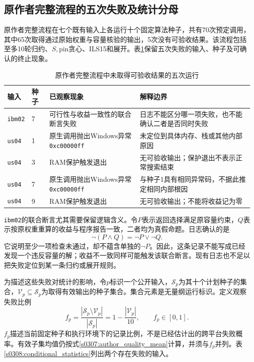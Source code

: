 \subsection{原作者完整流程的五次失败及统计分母}

原作者完整流程在七个既有输入上各运行十个固定算法种子，共有70次预定调用，其中65次取得通过原始权重与容量核验的输出，5次没有可验收结果。该流程包括至多10轮归约、$S,\mathrm{pin}$贪心、ILS15和展开\cite{GrossmannJRS2026}。表\ref{s0308:failure_details}保留五次失败的输入、种子及可确认的终止现象。

\begin{table}[tbp]
 \centering
 \small
 \caption{原作者完整流程中未取得可验收结果的五次运行}
 \label{s0308:failure_details}
 \begin{tabularx}{\linewidth}{@{}llXX@{}}
  \toprule
  输入 & 种子 & 已观察现象 & 解释边界\\
  \midrule
  \texttt{ibm02} & 7 & 可行性与收益一致性的联合断言失败 & 日志不能区分哪一项失败，也不能确认二者是否同时失败\\
  \texttt{us04} & 1 & 原生调用抛出Windows异常\texttt{0xc00000ff} & 未定位到具体内存、栈或其他内部原因\\
  \texttt{us04} & 3 & RAM保护触发退出 & 无可验收输出；保护退出不表示正常搜索结束\\
  \texttt{us04} & 7 & 原生调用抛出Windows异常\texttt{0xc00000ff} & 与种子1具有相同异常码，不据此推定相同内部根因\\
  \texttt{us04} & 9 & RAM保护触发退出 & 无可验收输出；不能将收益记为零\\
  \bottomrule
 \end{tabularx}
\end{table}

\texttt{ibm02}的联合断言尤其需要保留逻辑含义。令$P$表示返回选择满足原容量约束，$Q$表示按原权重重算的收益与程序报告一致，二者均为真假命题。日志确认的是
\begin{equation}
 \neg(P\land Q)=\neg P\lor\neg Q.
 \label{s0308:assertion_logic}
\end{equation}
它说明至少一项检查未通过，却不蕴含单独的$\neg P$。因此，这条记录不能写成已经发现一个违反容量的解；收益不一致同样可能触发该联合断言。现有日志也不足以把失败定位到某一条归约或展开规则。

为描述这些失败对统计的影响，令$p$标识一个公开输入，$\mathcal S_p$为其十个计划种子的集合，$\mathcal V_p\subseteq\mathcal S_p$为取得有效输出的种子集合。集合元素是无量纲运行标识。定义观察失败比例
\begin{equation}
 f_p=\frac{|\mathcal S_p\setminus\mathcal V_p|}{|\mathcal S_p|}
 =1-\frac{|\mathcal V_p|}{10},
 \qquad f_p\in[0,1].
 \label{s0308:failure_fraction}
\end{equation}
$f_p$描述当前固定种子和执行环境下的记录比例，不是已经估计出的跨平台失败概率。有效子集均值仍按式\eqref{s0307:author_quality_mean}计算，并须与$f_p$并列。表\ref{s0308:conditional_statistics}列出两个存在失败的输入。

